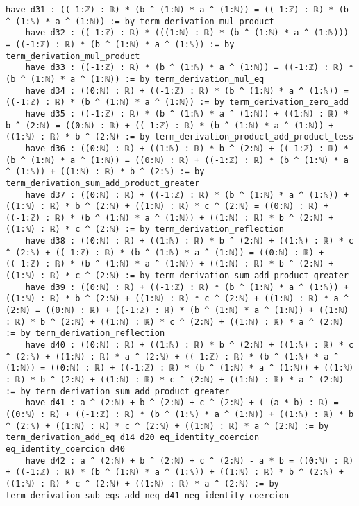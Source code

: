 \documentclass{article}
\begin{document}
\begin{tcolorbox}[colback=white!10, width=\linewidth]
\begin{lstlisting}[language=Lean4]
    have d31 : ((-1:ℤ) : ℝ) * (b ^ (1:ℕ) * a ^ (1:ℕ)) = ((-1:ℤ) : ℝ) * (b ^ (1:ℕ) * a ^ (1:ℕ)) := by term_derivation_mul_product
    have d32 : ((-1:ℤ) : ℝ) * (((1:ℕ) : ℝ) * (b ^ (1:ℕ) * a ^ (1:ℕ))) = ((-1:ℤ) : ℝ) * (b ^ (1:ℕ) * a ^ (1:ℕ)) := by term_derivation_mul_product
    have d33 : ((-1:ℤ) : ℝ) * (b ^ (1:ℕ) * a ^ (1:ℕ)) = ((-1:ℤ) : ℝ) * (b ^ (1:ℕ) * a ^ (1:ℕ)) := by term_derivation_mul_eq
    have d34 : ((0:ℕ) : ℝ) + ((-1:ℤ) : ℝ) * (b ^ (1:ℕ) * a ^ (1:ℕ)) = ((-1:ℤ) : ℝ) * (b ^ (1:ℕ) * a ^ (1:ℕ)) := by term_derivation_zero_add
    have d35 : ((-1:ℤ) : ℝ) * (b ^ (1:ℕ) * a ^ (1:ℕ)) + ((1:ℕ) : ℝ) * b ^ (2:ℕ) = ((0:ℕ) : ℝ) + ((-1:ℤ) : ℝ) * (b ^ (1:ℕ) * a ^ (1:ℕ)) + ((1:ℕ) : ℝ) * b ^ (2:ℕ) := by term_derivation_product_add_product_less
    have d36 : ((0:ℕ) : ℝ) + ((1:ℕ) : ℝ) * b ^ (2:ℕ) + ((-1:ℤ) : ℝ) * (b ^ (1:ℕ) * a ^ (1:ℕ)) = ((0:ℕ) : ℝ) + ((-1:ℤ) : ℝ) * (b ^ (1:ℕ) * a ^ (1:ℕ)) + ((1:ℕ) : ℝ) * b ^ (2:ℕ) := by term_derivation_sum_add_product_greater
    have d37 : ((0:ℕ) : ℝ) + ((-1:ℤ) : ℝ) * (b ^ (1:ℕ) * a ^ (1:ℕ)) + ((1:ℕ) : ℝ) * b ^ (2:ℕ) + ((1:ℕ) : ℝ) * c ^ (2:ℕ) = ((0:ℕ) : ℝ) + ((-1:ℤ) : ℝ) * (b ^ (1:ℕ) * a ^ (1:ℕ)) + ((1:ℕ) : ℝ) * b ^ (2:ℕ) + ((1:ℕ) : ℝ) * c ^ (2:ℕ) := by term_derivation_reflection
    have d38 : ((0:ℕ) : ℝ) + ((1:ℕ) : ℝ) * b ^ (2:ℕ) + ((1:ℕ) : ℝ) * c ^ (2:ℕ) + ((-1:ℤ) : ℝ) * (b ^ (1:ℕ) * a ^ (1:ℕ)) = ((0:ℕ) : ℝ) + ((-1:ℤ) : ℝ) * (b ^ (1:ℕ) * a ^ (1:ℕ)) + ((1:ℕ) : ℝ) * b ^ (2:ℕ) + ((1:ℕ) : ℝ) * c ^ (2:ℕ) := by term_derivation_sum_add_product_greater
    have d39 : ((0:ℕ) : ℝ) + ((-1:ℤ) : ℝ) * (b ^ (1:ℕ) * a ^ (1:ℕ)) + ((1:ℕ) : ℝ) * b ^ (2:ℕ) + ((1:ℕ) : ℝ) * c ^ (2:ℕ) + ((1:ℕ) : ℝ) * a ^ (2:ℕ) = ((0:ℕ) : ℝ) + ((-1:ℤ) : ℝ) * (b ^ (1:ℕ) * a ^ (1:ℕ)) + ((1:ℕ) : ℝ) * b ^ (2:ℕ) + ((1:ℕ) : ℝ) * c ^ (2:ℕ) + ((1:ℕ) : ℝ) * a ^ (2:ℕ) := by term_derivation_reflection
    have d40 : ((0:ℕ) : ℝ) + ((1:ℕ) : ℝ) * b ^ (2:ℕ) + ((1:ℕ) : ℝ) * c ^ (2:ℕ) + ((1:ℕ) : ℝ) * a ^ (2:ℕ) + ((-1:ℤ) : ℝ) * (b ^ (1:ℕ) * a ^ (1:ℕ)) = ((0:ℕ) : ℝ) + ((-1:ℤ) : ℝ) * (b ^ (1:ℕ) * a ^ (1:ℕ)) + ((1:ℕ) : ℝ) * b ^ (2:ℕ) + ((1:ℕ) : ℝ) * c ^ (2:ℕ) + ((1:ℕ) : ℝ) * a ^ (2:ℕ) := by term_derivation_sum_add_product_greater
    have d41 : a ^ (2:ℕ) + b ^ (2:ℕ) + c ^ (2:ℕ) + (-(a * b) : ℝ) = ((0:ℕ) : ℝ) + ((-1:ℤ) : ℝ) * (b ^ (1:ℕ) * a ^ (1:ℕ)) + ((1:ℕ) : ℝ) * b ^ (2:ℕ) + ((1:ℕ) : ℝ) * c ^ (2:ℕ) + ((1:ℕ) : ℝ) * a ^ (2:ℕ) := by term_derivation_add_eq d14 d20 eq_identity_coercion eq_identity_coercion d40
    have d42 : a ^ (2:ℕ) + b ^ (2:ℕ) + c ^ (2:ℕ) - a * b = ((0:ℕ) : ℝ) + ((-1:ℤ) : ℝ) * (b ^ (1:ℕ) * a ^ (1:ℕ)) + ((1:ℕ) : ℝ) * b ^ (2:ℕ) + ((1:ℕ) : ℝ) * c ^ (2:ℕ) + ((1:ℕ) : ℝ) * a ^ (2:ℕ) := by term_derivation_sub_eqs_add_neg d41 neg_identity_coercion

\end{lstlisting}
\end{tcolorbox}
\end{document}
